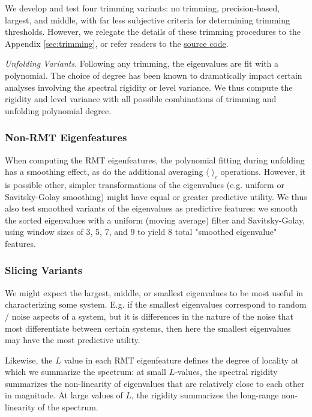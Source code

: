 \documentclass[12pt]{spieman}  %
\begin{document}
\begin{spacing}{2}
We develop and test four trimming variants: no trimming, precision-based,
largest, and middle, with far less subjective criteria for determining
trimming thresholds. However, we relegate the details of these trimming
procedures to the Appendix \ref{sec:trimming}, or refer readers to the \href{https://github.com/DM-Berger/random-matrix-fmri/blob/7c9e4187f582dedee728cd7193b8894d928c2f00/code/rmt/updated_dataset.py#L431-L444}{source code}.

\textit{Unfolding Variants}. Following any trimming, the eigenvalues are fit
with a polynomial. The choice of degree has been known to dramatically impact
certain analyses involving the spectral rigidity or level
variance\cite{abul-magdUnfoldingSpectrumChaotic2014,
moralesImprovedUnfoldingDetrending2011, abueleninSpectralUnfoldingChaotic2018,
fossionRandommatrixSpectraTime2013, abueleninEffectUnfoldingSpectral2012}. We
thus compute the rigidity and level variance with all possible combinations of
trimming and unfolding polynomial degree.

\subsubsection{Non-RMT Eigenfeatures}
\label{sec:eigs-only}

When computing the RMT eigenfeatures, the polynomial fitting during unfolding
has a smoothing effect, as do the additional averaging \(\langle\;\rangle_c\)
operations. However, it is possible other, simpler
transformations of the eigenvalues (e.g. uniform or Savitsky-Golay smoothing)
might have equal or greater predictive utility. We thus also test smoothed
variants of the eigenvalues as predictive features: we smooth the sorted
eigenvalues with a uniform (moving average) filter and Savitsky-Golay, using
window sizes of 3, 5, 7, and 9 to yield 8 total "smoothed eigenvalue" features.


\subsubsection{Slicing Variants}

We might expect the largest, middle, or smallest eigenvalues to be most useful
in characterizing some system. E.g. if the smallest eigenvalues correspond to
random / noise aspects of a system, but it is differences in the nature of the
noise that most differentiate between certain systems, then here the smallest
eigenvalues may have the most predictive utility.

Likewise, the \(L\) value in each RMT eigenfeature defines the degree of
locality at which we summarize the spectrum: at small \(L\)-values, the
spectral rigidity summarizes the non-linearity of eigenvalues that are
relatively close to each other in magnitude. At large values of \(L\), the rigidity
summarizes the long-range non-linearity of the spectrum.


\end{spacing}
\end{document}

